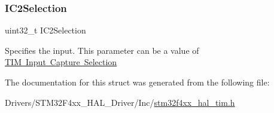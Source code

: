 \subsubsection{\texorpdfstring{I\+C2\+Selection}{IC2Selection}}
{\footnotesize\ttfamily uint32\+\_\+t I\+C2\+Selection}

Specifies the input. This parameter can be a value of \mbox{\hyperlink{group___t_i_m___input___capture___selection}{T\+IM Input Capture Selection}} 

The documentation for this struct was generated from the following file\+:\begin{DoxyCompactItemize}
\item 
Drivers/\+S\+T\+M32\+F4xx\+\_\+\+H\+A\+L\+\_\+\+Driver/\+Inc/\mbox{\hyperlink{stm32f4xx__hal__tim_8h}{stm32f4xx\+\_\+hal\+\_\+tim.\+h}}\end{DoxyCompactItemize}
